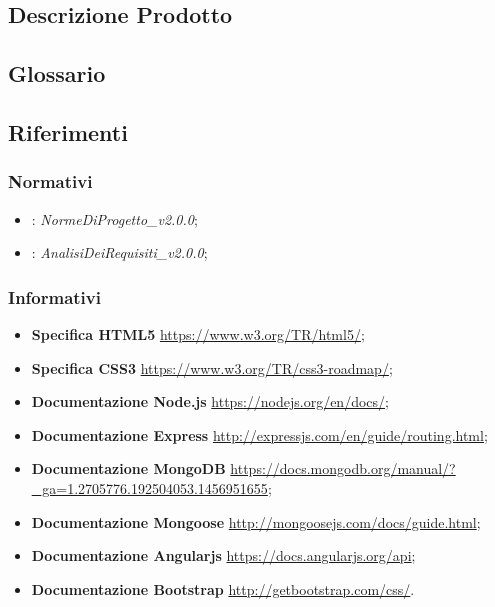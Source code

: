 \documentclass[12pt,a4paper]{article}
\begin{document}
\subsection{Descrizione Prodotto}
\descrizioneProdotto

\subsection{Glossario}
\glossarioPrint

\subsection{Riferimenti}

\subsubsection{Normativi}
\begin{itemize}
    \item \NdP{}: \textit{NormeDiProgetto\_v2.0.0};
    \item \AdR{}: \textit{AnalisiDeiRequisiti\_v2.0.0};
\end{itemize}

\subsubsection{Informativi}
\begin{itemize}
    \item \textbf{Specifica HTML5} \url{https://www.w3.org/TR/html5/};
    \item \textbf{Specifica CSS3} \url{https://www.w3.org/TR/css3-roadmap/};
    \item \textbf{Documentazione Node.js} \url{https://nodejs.org/en/docs/};
    \item \textbf{Documentazione Express} \url{http://expressjs.com/en/guide/routing.html};
    \item \textbf{Documentazione MongoDB} \url{https://docs.mongodb.org/manual/?_ga=1.2705776.192504053.1456951655};
    \item \textbf{Documentazione Mongoose} \url{http://mongoosejs.com/docs/guide.html};
    \item \textbf{Documentazione Angularjs} \url{https://docs.angularjs.org/api};
    \item \textbf{Documentazione Bootstrap} \url{http://getbootstrap.com/css/}.
\end{itemize}

\newpage
\end{document}
